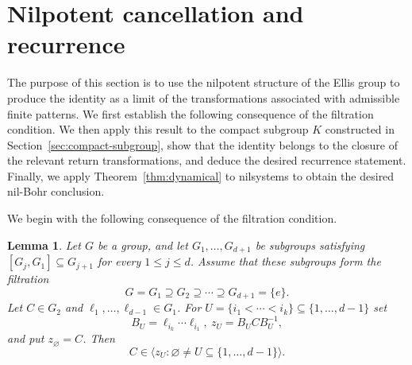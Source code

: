 \documentclass[11pt]{amsart}
\newtheorem{lemma}[theorem]{Lemma}
\theoremstyle{definition}
\theoremstyle{remark}
\begin{document}
\section{Nilpotent cancellation and recurrence}\label{sec:proof}

 The purpose of this section is to use the nilpotent structure of the Ellis group to produce the identity as a limit of the transformations associated with admissible finite patterns.  
  We first establish the following consequence
of the filtration condition.  We then apply this result to the compact subgroup $K$ constructed in Section~\ref{sec:compact-subgroup}, show that the identity belongs to the closure of the relevant return transformations,
and deduce the desired recurrence statement.  Finally, we apply
Theorem~\ref{thm:dynamical} to nilsystems to obtain the desired nil-Bohr conclusion.
 
 
 
  
 
 We begin with the following consequence of the filtration condition.
 
 
\begin{lemma}\label{lem:cap}
Let $G$ be a group, and let $G_1,\ldots,G_{d+1}$ be subgroups satisfying $[G_j,G_1]\subseteq G_{j+1}$ for every $1\leq j\leq d$.  Assume that these subgroups form the filtration
\[
 G=G_1\supseteq G_2\supseteq\cdots\supseteq G_{d+1}=\{e\}.
\]
Let $C\in G_2$ and $\ell_1,\ldots,\ell_{d-1}\in G_1$.  For
$U=\{i_1<\cdots<i_k\}\subseteq\{1,\ldots,d-1\}$ set
\[
 B_U=\ell_{i_k}\cdots\ell_{i_1},
 \ z_U=B_UCB_U^{-1},
\]
and put $z_\varnothing=C$.  Then
\[
  C\in \big\langle z_U:\varnothing\neq U\subseteq\{1,\ldots,d-1\}\big\rangle.  
\]
 
\end{lemma}
\end{document}
